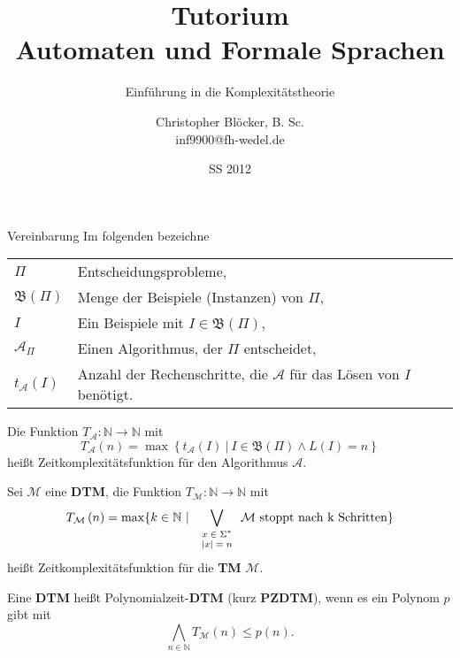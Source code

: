 \documentclass[]{beamer}
\author[Christopher Blöcker, B. Sc.]{Christopher Blöcker, B. Sc.\\ inf9900@fh-wedel.de}
\title[AFS Tutorium]{Tutorium\\Automaten und Formale Sprachen}
\date{SS 2012}
\subtitle{Einführung in die Komplexitätstheorie}
\begin{document}
\begin{frame}
  \titlepage
\end{frame}

\begin{frame}[squeeze]{}
  \begin{block}{Vereinbarung}
    Im folgenden bezeichne \\
    \vspace*{0.5em}
    \begin{tabular}{l l}
      $\Pi$                            & Entscheidungsprobleme, \\
      $\mathfrak{B} \left( \Pi \right)$ & Menge der Beispiele (Instanzen) von $\Pi$, \\
      $I$                              & Ein Beispiele mit $I \in \mathfrak{B} \left( \Pi \right)$, \\
      $\mathcal{A}_\Pi$                & Einen Algorithmus, der $\Pi$ entscheidet, \\
      $t_\mathcal{A} \left( I \right)$ & Anzahl der Rechenschritte, die $\mathcal{A}$ für das Lösen von $I$ benötigt. \\
    \end{tabular}
  \end{block}
  
  \pause
  
  \begin{definition}
    Die Funktion $T_\mathcal{A} : \mathbb{N} \to \mathbb{N}$ mit
    \[T_\mathcal{A} \left( n \right) = \max \left\{ t_\mathcal{A} \left( I \right) \ | \ I \in \mathfrak{B} \left( \Pi \right) \wedge L \left( I \right) = n \right\} \]
    heißt Zeitkomplexitätsfunktion für den Algorithmus $\mathcal{A}$.
  \end{definition}
\end{frame}

\begin{frame}[squeeze]{}
  \begin{definition}
    Sei $\mathcal{M}$ eine \textbf{DTM}, die Funktion $T_\mathcal{M} : \mathbb{N} \to \mathbb{N}$ mit
    \[T_\mathcal{M} \left( n \right) = \max \{ k \in \mathbb{N} \ | \ \bigvee_{\begin{scriptsize} \begin{array}{c} x \in \Sigma^* \\ |x| = n \end{array} \end{scriptsize}} \mathcal{M} \text{ stoppt nach k Schritten} \} \]
    heißt Zeitkomplexitätsfunktion für die \textbf{TM} $\mathcal{M}$.
  \end{definition}
  
  \pause
  
  \begin{definition}
    Eine \textbf{DTM} heißt Polynomialzeit-\textbf{DTM} (kurz \textbf{PZDTM}), wenn es ein Polynom $p$ gibt mit
    \[\bigwedge_{n \in \mathbb{N}} T_\mathcal{M} \left( n \right) \leq p \left( n \right). \]
  \end{definition}
\end{frame}
\end{document}
